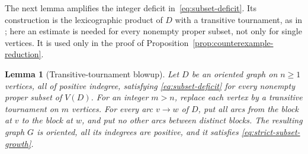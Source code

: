 \documentclass[11pt]{article}
\newtheorem{lemma}[theorem]{Lemma}
\theoremstyle{remark}
\begin{document}
The next lemma amplifies the integer deficit in~\eqref{eq:subset-deficit}. Its
construction is the lexicographic product of $D$ with a transitive tournament,
as in \cite[Theorem~4.3]{BrantnerBrockmanKaySnively2009}; here an estimate is
needed for every nonempty proper subset, not only for single vertices. It is
used only in the proof of Proposition~\ref{prop:counterexample-reduction}.

\begin{lemma}[Transitive-tournament blowup]
\label{lem:blowup}
Let $D$ be an oriented graph on $n\ge1$ vertices, all of positive
indegree, satisfying \eqref{eq:subset-deficit} for every nonempty proper
subset of $V(D)$. For an integer $m>n$, replace each vertex by a
transitive tournament on $m$ vertices. For every arc $v\to w$ of $D$,
put all arcs from the block at $v$ to the block at $w$, and put no other
arcs between distinct blocks. The resulting graph $G$ is oriented,
all its indegrees are positive, and it satisfies
\eqref{eq:strict-subset-growth}.
\end{lemma}
\end{document}
